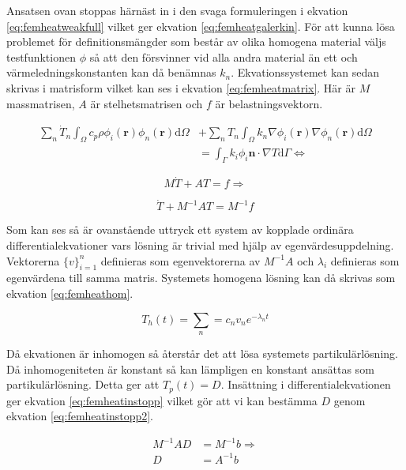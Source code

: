 \noindent
Ansatsen ovan stoppas härnäst in i den svaga formuleringen i ekvation
\eqref{eq:femheatweakfull} vilket ger ekvation \eqref{eq:femheatgalerkin}.
För att kunna lösa problemet för definitionsmängder som består av olika
homogena material väljs testfunktionen $\phi$ så att den försvinner vid
alla andra material än ett och värmeledningskonstanten kan då benämnas $k_n$.
Ekvationssystemet kan sedan skrivas i matrisform vilket kan ses i ekvation
\eqref{eq:femheatmatrix}. Här är $M$ massmatrisen, $A$ är stelhetsmatrisen och
$f$ är belastningsvektorn.

\begin{align}
\label{eq:femheatgalerkin}
\sum_n \dot{T}_n \int_\Omega c_p\rho\phi_i(\mathbf{r})
\phi_n(\mathbf{r})\mathrm{d}\Omega
& + \sum_n T_n \int_\Omega k_n \nabla\phi_i(\mathbf{r})\nabla\phi_n(\mathbf{r})
\mathrm{d}\Omega \\
&= \int_\Gamma k_i\phi_i\mathbf{n}\cdot\nabla T\mathrm{d}\Gamma \Leftrightarrow
\nonumber
\end{align}

\begin{equation}
\label{eq:femheatmatrix}
M\dot{T} + AT = f \Rightarrow
\end{equation}

\begin{equation}
\label{eq:femheatmatrix2}
\dot{T} + M^{-1}AT = M^{-1}f
\end{equation}

\noindent
Som kan ses så är ovanstående uttryck ett system av kopplade ordinära
differentialekvationer vars lösning är trivial med hjälp av egenvärdesuppdelning.
Vektorerna $\{v\}^n_{i=1}$ definieras som egenvektorerna av
$M^{-1}A$ och $\lambda_i$ definieras som egenvärdena till samma matris.
Systemets homogena lösning kan då skrivas som ekvation
\eqref{eq:femheathom}.\cite{lay06}

\begin{equation}
\label{eq:femheathom}
T_h(t) = \sum_n = c_nv_ne^{-\lambda_nt}
\end{equation}

\noindent
Då ekvationen är inhomogen så återstår det att lösa systemets
partikulärlösning. Då inhomogeniteten är konstant så kan lämpligen
en konstant ansättas som partikulärlösning. Detta ger att
$T_p(t) = D$. Insättning i differentialekvationen ger
ekvation \eqref{eq:femheatinstopp} vilket gör att vi kan bestämma
$D$ genom ekvation \eqref{eq:femheatinstopp2}.

\begin{align}
\label{eq:femheatinstopp}
M^{-1}AD &= M^{-1}b \Rightarrow\\
\label{eq:femheatinstopp2}
D &= A^{-1}b
\end{align}

